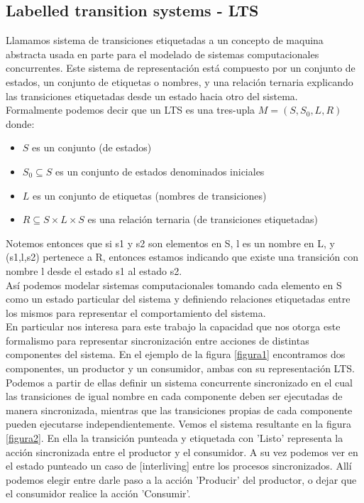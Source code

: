 \documentclass[titlepage, 12pt]{book}
\begin{document}
\subsection{Labelled transition systems - LTS}
Llamamos sistema de transiciones etiquetadas a un concepto de maquina abstracta usada en parte para el modelado de sistemas computacionales concurrentes. Este sistema de representaci\'on est\'a compuesto por un conjunto de estados, un conjunto de etiquetas o nombres, y una relaci\'on ternaria explicando las transiciones etiquetadas desde un estado hacia otro del sistema.\\
Formalmente podemos decir que un LTS es una tres-upla $M = (S,S_{0},L,R)$ donde:
\begin{itemize}
\item $S$ es un conjunto (de estados)
\item $S_0 \subseteq S$ es un conjunto de estados denominados iniciales
\item $L$ es un conjunto de etiquetas (nombres de transiciones)
\item $R \subseteq S \times L \times S$ es una relaci\'on ternaria (de transiciones etiquetadas)
\end{itemize}
Notemos entonces que si s1 y s2 son elementos en S, l es un nombre en L, y (s1,l,s2) pertenece a R, entonces estamos indicando que existe una transici\'on con nombre l desde el estado s1 al estado s2.\\
As\'i podemos modelar sistemas computacionales tomando cada elemento en S como un estado particular del sistema y definiendo relaciones etiquetadas entre los mismos para representar el comportamiento del sistema.\\

En particular nos interesa para este trabajo la capacidad que nos otorga este formalismo para representar sincronizaci\'on entre acciones de distintas componentes del sistema. En el ejemplo de la figura \ref{figura1} encontramos dos componentes, un productor y un consumidor, ambas con su representaci\'on LTS. Podemos a partir de ellas definir un sistema concurrente sincronizado en el cual las transiciones de igual nombre en cada componente deben ser ejecutadas de manera sincronizada, mientras que las transiciones propias de cada componente pueden ejecutarse independientemente. Vemos el sistema resultante en la figura \ref{figura2}. En ella la transici\'on punteada y etiquetada con 'Listo' representa la acci\'on sincronizada entre el productor y el consumidor. A su vez podemos ver en el estado punteado un caso de [interliving] entre los procesos sincronizados. All\'i podemos elegir entre darle paso a la acci\'on 'Producir' del productor, o dejar que el consumidor realice la acci\'on 'Consumir'. 
\end{document}
